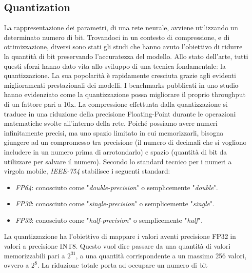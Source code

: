\subsection{Quantization}
La rappresentazione dei parametri, di una rete neurale, avviene utilizzando 
un determinato numero di bit. Trovandoci in un contesto di compressione, e 
di ottimizzazione, diversi sono stati gli studi che hanno avuto l'obiettivo di 
ridurre la quantità di bit preservando l'accuratezza del modello. Allo stato 
dell'arte, tutti questi sforzi hanno dato vita allo sviluppo di una tecnica 
fondamentale: la quantizzazione. La sua popolarità è rapidamente cresciuta 
grazie agli evidenti miglioramenti prestazionali dei modelli. I benchmarks 
pubblicati in uno studio \cite{quantization_speed} hanno evidenziato come la quantizzazione possa 
migliorare il proprio throughput di un fattore pari a 10x. La compressione 
effettuata dalla quantizzazione si traduce in una riduzione della precisione 
Floating-Point durante le operazioni matematiche svolte all'interno della 
rete. Poiché possiamo avere numeri infinitamente precisi, ma uno spazio 
limitato in cui memorizzarli, bisogna giungere ad un compromesso tra 
precisione (il numero di decimali che si vogliono includere in un numero 
prima di arrotondarlo) e spazio (quantità di bit da utilizzare per salvare 
il numero). Secondo lo standard tecnico per i numeri a virgola mobile, 
\emph{IEEE-754} stabilisce i seguenti standard:
\begin{itemize}
    \item \emph{FP64}: conosciuto come "\emph{double-precision}" o semplicemente "\emph{double}". 
    \item \emph{FP32}: conosciuto come "\emph{single-precision}" o semplicemente "\emph{single}".
    \item \emph{FP32}: conosciuto come "\emph{half-precision}" o semplicemente "\emph{half}".
\end{itemize}
La quantizzazione ha l'obiettivo di mappare i valori aventi precisione FP32 
in valori a precisione INT8. Questo vuol dire passare da una quantità di valori 
memorizzabili pari a $2^{31}$, a una quantità  corrispondente a un massimo 256 
valori, ovvero a $2^8$. La riduzione totale porta ad occupare un numero di bit 
